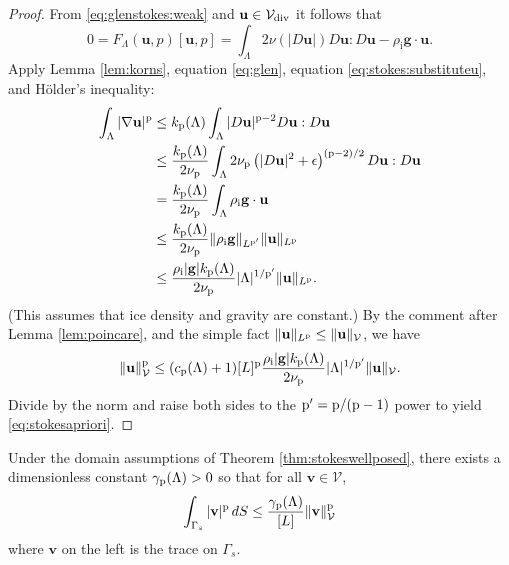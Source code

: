 \documentclass[hidelinks,onefignum,onetabnum,final]{siamart220329}  %
\newcommand{\eps}{\epsilon}
\newcommand{\grad}{\nabla}
\newcommand{\bg}{\mathbf{g}}
\newcommand{\bu}{\mathbf{u}}
\newcommand{\bv}{\mathbf{v}}
\newcommand{\cV}{\mathcal{V}}
\newcommand{\pp}{{\text{\textnormal{p}}}}
\newcommand{\rhoi}{\rho_{\text{i}}}
\newcommand{\Vdiv}{\cV_{\text{\textnormal{div}}}}
\begin{document}
\begin{proof}
From \eqref{eq:glenstokes:weak} and $\bu \in\Vdiv$ it follows that
\begin{equation}
0= F_\Lambda(\bu,p)[\bu,p] = \int_\Lambda 2 \nu(|D\bu|) D\bu : D\bu - \rhoi \bg \cdot \bu.  \label{eq:stokes:substituteu}
\end{equation}
Apply Lemma \ref{lem:korns}, equation \eqref{eq:glen}, equation \eqref{eq:stokes:substituteu}, and H\"older's inequality:
\begin{align}
\int_\Lambda |\grad\bu|^\pp &\le k_{\pp}(\Lambda) \int_\Lambda |D\bu|^{\pp-2} D\bu:D\bu \label{eq:stokes:workapriori} \\
	&\le \frac{k_{\pp}(\Lambda)}{2 \nu_\pp} \int_\Lambda 2 \nu_\pp \left(|D\bu|^2 + \eps\right)^{(\pp-2)/2} D\bu:D\bu \notag \\
	&= \frac{k_{\pp}(\Lambda)}{2 \nu_\pp} \int_\Lambda \rhoi \bg \cdot \bu \notag \\
	&\le \frac{k_{\pp}(\Lambda)}{2 \nu_\pp} \|\rhoi \bg\|_{L^{\pp'}} \|\bu\|_{L^\pp} \notag \\
	&\le \frac{\rhoi |\bg| k_{\pp}(\Lambda)}{2 \nu_\pp} |\Lambda|^{1/\pp'} \|\bu\|_{L^\pp}. \notag
\end{align}
(This assumes that ice density and gravity are constant.)  By the comment after Lemma \ref{lem:poincare}, and the simple fact $\|\bu\|_{L^\pp} \le \|\bu\|_{\cV}$, we have
\begin{align*}
\|\bu\|_{\cV}^\pp \le (c_{\pp}(\Lambda) + 1) [L]^\pp \frac{\rhoi |\bg| k_{\pp}(\Lambda)}{2 \nu_\pp} |\Lambda|^{1/\pp'} \|\bu\|_{\cV}.
\end{align*}
Divide by the norm and raise both sides to the $\pp' = \pp/(\pp-1)$ power to yield \eqref{eq:stokesapriori}.
\end{proof}

\begin{lemma} \label{lem:trace}
Under the domain assumptions of Theorem \ref{thm:stokeswellposed}, there exists a dimensionless constant $\gamma_{\pp}(\Lambda)>0$ so that for all $\bv \in \cV$,
\begin{equation}
\int_{\Gamma_s} |\bv|^\pp \,dS \le \frac{\gamma_{\pp}(\Lambda)}{[L]} \|\bv\|_{\cV}^\pp \label{eq:trace}
\end{equation}
where $\bv$ on the left is the trace on $\Gamma_s$.
\end{lemma}
\end{document}
